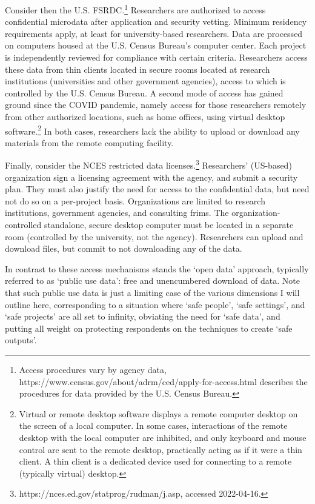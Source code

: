 Consider then the U.S. \ac{FSRDC}.\footnote{Access procedures vary by agency data, https://www.census.gov/about/adrm/ced/apply-for-access.html describes the procedures for data provided by the U.S. Census Bureau.} Researchers are authorized to access confidential microdata after application and security vetting. Minimum residency requirements apply, at least for university-based researchers. Data are processed on computers housed at the U.S. Census Bureau's computer center. Each project is independently reviewed for compliance with certain criteria. Researchers access these data from thin clients located in secure rooms located at research institutions (universities and other government agencies), access to which is controlled by the U.S. Census Bureau. A second mode of access has gained ground since the COVID pandemic, namely access for those researchers remotely from other authorized locations, such as home offices, using virtual desktop software.\footnote{Virtual or remote desktop software displays a remote computer desktop on the screen of a local computer. In some cases, interactions of the remote desktop with the local computer are inhibited, and only keyboard and mouse control are sent to the remote desktop, practically acting as if it were a thin client.  A thin client is a dedicated device used for connecting to a remote (typically virtual) desktop.} In both cases, researchers lack the ability to upload or download any materials from the remote computing facility. 

Finally, consider the \ac{NCES} restricted data licenses.\footnote{https://nces.ed.gov/statprog/rudman/j.asp, accessed 2022-04-16.} Researchers' (US-based) organization sign a licensing agreement with the agency, and submit a security plan. They must also justify the need for access to the confidential data, but need not do so on a per-project basis. Organizations are limited to research institutions, government agencies, and consulting frims. The organization-controlled standalone, secure desktop computer must be located in a separate room (controlled by the university, not the agency). Researchers can upload and download files, but commit to not downloading any of the data. 

In contrast to these access mechanisms stands the `open data' approach, typically referred to as `public use data': free and unencumbered download of data. Note that such public use data is just a limiting case of the various dimensions I will outline here, corresponding to a situation where `safe people', `safe settings', and `safe projects' are all set to infinity, obviating the need for `safe data', and putting all weight on protecting respondents on the techniques to create `safe outputs'. 

